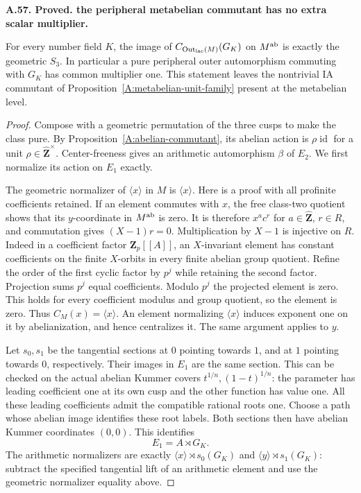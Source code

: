 \documentclass[11pt,oneside]{article}
\makeatletter
\newcounter{statementanchor}
\newenvironment{statement}[3]{%
 \refstepcounter{statementanchor}\def\@currentlabel{#1}%
 \par\addvspace{9pt}\noindent
 \textbf{#1. #2. #3.}\par\nobreak\noindent\ignorespaces
}{\par\addvspace{5pt}}
\makeatother
\begin{document}
\begin{statement}{A.57}{Proved}{the peripheral metabelian commutant has no extra scalar multiplier}
\label{st:A.57}
\label{A:metabelian-multiplier}
For every number field $K$, the image of
$C_{\operatorname{Out}_{\rm lac}(M)}(G_K)$ on
$M^{\rm ab}$ is exactly the geometric $S_3$.
In particular a pure peripheral outer automorphism
commuting with $G_K$ has common multiplier one.
This statement leaves the nontrivial IA commutant of
Proposition~\ref{A:metabelian-unit-family} present at
the metabelian level.
\end{statement}
\begin{proof}
Compose with a geometric permutation of the three cusps
to make the class pure. By
Proposition~\ref{A:abelian-commutant}, its abelian action
is $\rho\operatorname{id}$ for a unit
$\rho\in\widehat{\mathbf Z}^{\times}$. Center-freeness
gives an arithmetic automorphism $\beta$ of $E_2$.
We first normalize its action on $E_1$ exactly.

The geometric normalizer of $\langle x\rangle$ in $M$
is $\langle x\rangle$. Here is a proof with all
profinite coefficients retained. If an element commutes
with $x$, the free class-two quotient shows that its
$y$-coordinate in $M^{\rm ab}$ is zero. It is therefore
$x^a c^r$ for $a\in\widehat{\mathbf Z}$, $r\in R$,
and commutation gives $(X-1)r=0$. Multiplication by
$X-1$ is injective on $R$. Indeed in a coefficient
factor $\mathbf Z_p[[A]]$, an $X$-invariant element has
constant coefficients on the finite $X$-orbits in
every finite abelian group quotient. Refine the order
of the first cyclic factor by $p^j$ while retaining
the second factor. Projection sums $p^j$ equal
coefficients. Modulo $p^j$ the projected element is
zero. This holds for every coefficient modulus and
group quotient, so the element is zero. Thus
$C_M(x)=\langle x\rangle$. An element normalizing
$\langle x\rangle$ induces exponent one on it by
abelianization, and hence centralizes it. The same
argument applies to $y$.

Let $s_0,s_1$ be the tangential sections at $0$ pointing
towards $1$, and at $1$ pointing towards $0$,
respectively. Their images in $E_1$ are the same
section. This can be checked on the actual abelian
Kummer covers $t^{1/n},(1-t)^{1/n}$: the parameter
has leading coefficient one at its own cusp and the
other function has value one. All these leading
coefficients admit the compatible rational roots one.
Choose a path whose abelian image identifies these
root labels. Both sections then have abelian Kummer
coordinates $(0,0)$. This identifies
\[
              E_1=A\rtimes G_K.
\]
The arithmetic normalizers are exactly
$\langle x\rangle\rtimes s_0(G_K)$ and
$\langle y\rangle\rtimes s_1(G_K)$: subtract the
specified tangential lift of an arithmetic element
and use the geometric normalizer equality above.


\end{proof}
\end{document}
